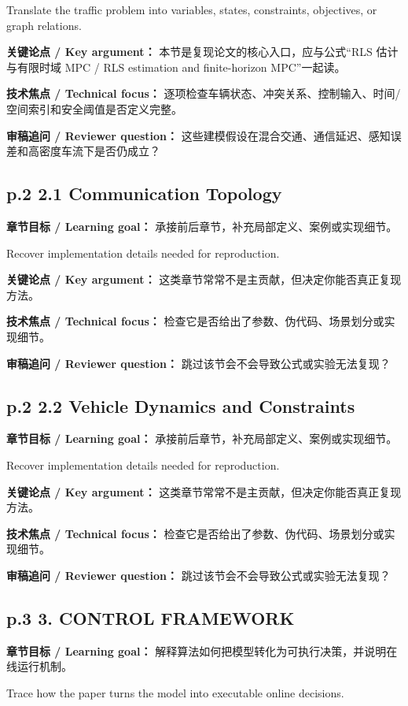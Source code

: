 \documentclass[UTF8,a4paper,11pt,fontset=fandol]{ctexart}
\begin{document}
Translate the traffic problem into variables, states, constraints, objectives, or graph relations.

\textbf{关键论点 / Key argument：} 本节是复现论文的核心入口，应与公式“RLS 估计与有限时域 MPC / RLS estimation and finite-horizon MPC”一起读。

\textbf{技术焦点 / Technical focus：} 逐项检查车辆状态、冲突关系、控制输入、时间/空间索引和安全阈值是否定义完整。

\textbf{审稿追问 / Reviewer question：} 这些建模假设在混合交通、通信延迟、感知误差和高密度车流下是否仍成立？

\subsection*{p.2 2.1 Communication Topology}
\textbf{章节目标 / Learning goal：} 承接前后章节，补充局部定义、案例或实现细节。

Recover implementation details needed for reproduction.

\textbf{关键论点 / Key argument：} 这类章节常常不是主贡献，但决定你能否真正复现方法。

\textbf{技术焦点 / Technical focus：} 检查它是否给出了参数、伪代码、场景划分或实现细节。

\textbf{审稿追问 / Reviewer question：} 跳过该节会不会导致公式或实验无法复现？

\subsection*{p.2 2.2 Vehicle Dynamics and Constraints}
\textbf{章节目标 / Learning goal：} 承接前后章节，补充局部定义、案例或实现细节。

Recover implementation details needed for reproduction.

\textbf{关键论点 / Key argument：} 这类章节常常不是主贡献，但决定你能否真正复现方法。

\textbf{技术焦点 / Technical focus：} 检查它是否给出了参数、伪代码、场景划分或实现细节。

\textbf{审稿追问 / Reviewer question：} 跳过该节会不会导致公式或实验无法复现？

\subsection*{p.3 3. CONTROL FRAMEWORK}
\textbf{章节目标 / Learning goal：} 解释算法如何把模型转化为可执行决策，并说明在线运行机制。

Trace how the paper turns the model into executable online decisions.
\end{document}
